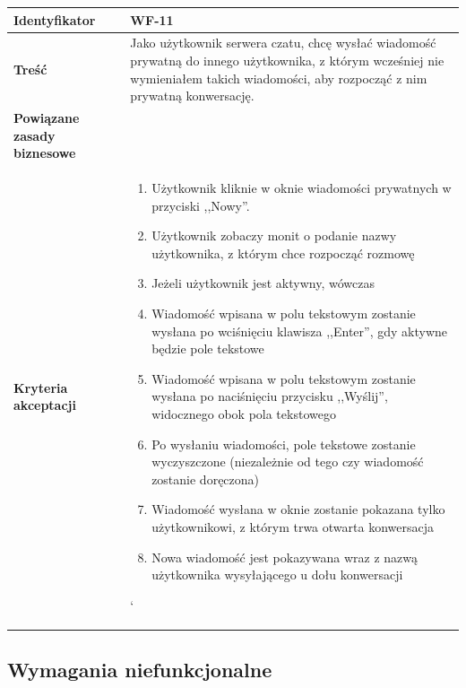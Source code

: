 \documentclass[11pt,oneside,a4paper,titlepage,onecolumn]{article}
\newenvironment{enumreq}
{ \begin{enumerate}[topsep=0pt,itemsep=-1ex,partopsep=1ex,parsep=1ex] }
{ \end{enumerate}                  }
\begin{document}
\begin{tabular}{ | l | l | }
	\hline
		\textbf{Identyfikator} & 
		WF-11
		\\
		
	\hline
		\textbf{Treść} & \parbox[t]{11cm}{
			Jako użytkownik serwera czatu, chcę wysłać wiadomość 
			prywatną do innego użytkownika, z którym wcześniej nie
			wymieniałem takich wiadomości, aby rozpocząć z nim
			prywatną konwersację.
		}\\
		 
	\hline
		\parbox[t]{4cm}{\textbf{Powiązane zasady biznesowe}} & \parbox[t]{11cm}{
			
			
		}\\
		
	\hline
		\parbox[t]{4cm}{\textbf{Kryteria akceptacji}} & \parbox[t]{11cm}{
			\begin{enumreq}
				\item Użytkownik kliknie w oknie wiadomości
				prywatnych w przyciski ,,Nowy''.
				\item Użytkownik zobaczy monit o podanie nazwy
				użytkownika, z którym chce rozpocząć rozmowę
				\item Jeżeli użytkownik jest aktywny, wówczas 
				\item Wiadomość wpisana w polu tekstowym zostanie
				wysłana po wciśnięciu klawisza ,,Enter'', gdy
				aktywne
				będzie pole tekstowe
				\item Wiadomość wpisana w polu tekstowym zostanie
				wysłana po naciśnięciu przycisku ,,Wyślij'',
				widocznego obok pola tekstowego
				\item Po wysłaniu wiadomości, pole tekstowe zostanie
				wyczyszczone (niezależnie od tego czy wiadomość
				zostanie doręczona)
				\item Wiadomość wysłana w oknie zostanie pokazana
				tylko użytkownikowi, z którym trwa otwarta
				konwersacja
				\item Nowa wiadomość jest pokazywana wraz z nazwą
				użytkownika wysyłającego u dołu konwersacji
			\end{enumreq}`								
			}
		\\

	\hline
\end{tabular}

\subsection{Wymagania niefunkcjonalne}
\end{document}
